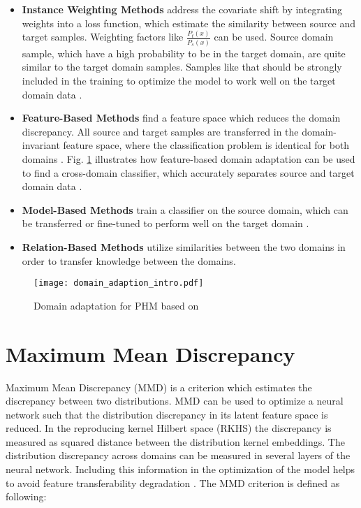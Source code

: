 \begin{itemize}
\item \textbf{Instance Weighting Methods} address the covariate shift by integrating weights into a loss function, which estimate the similarity between source and target samples. Weighting factors like $\frac{P_{t}(x)}{P_{s}(x)}$ can be used. Source domain sample, which have a high probability to be in the target domain, are quite similar to the target domain samples. Samples like that should be strongly included in the training to optimize the model to work well on the target domain data \cite{AZAMFAR2020103932}.
\item \textbf{Feature-Based Methods} find a feature space which reduces the domain discrepancy. All source and target samples are transferred in the domain-invariant feature space, where the classification problem is identical for both domains \cite{AZAMFAR2020103932}. Fig. \ref{fig:Domain_adaption_intro} illustrates how feature-based domain adaptation can be used to find a cross-domain classifier, which accurately separates source and target domain data \cite{AZAMFAR2020103932}. 
\item \textbf{Model-Based Methods} train a classifier on the source domain, which can be transferred or fine-tuned to perform well on the target domain \cite{AZAMFAR2020103932}.
\item \textbf{Relation-Based Methods} utilize similarities between the two domains in order to transfer knowledge between the domains\cite{AZAMFAR2020103932}. 
\end{itemize}

\begin{figure}[H]
  \centering
  \texttt{[image: domain\_adaption\_intro.pdf]}
  \caption {Domain adaptation for PHM based on \cite{Pandhare2021}} \label{fig:Domain_adaption_intro}
\end{figure}


\section{Maximum Mean Discrepancy}
Maximum Mean Discrepancy (MMD) is a criterion which estimates the discrepancy between two distributions. MMD can be used to optimize a neural network such that the distribution discrepancy in its latent feature space is reduced. In the reproducing kernel Hilbert space (RKHS) the discrepancy is measured as squared distance between the distribution kernel embeddings. The distribution discrepancy across domains can be measured in several layers of the neural network. Including this information in the optimization of the model helps to avoid feature transferability degradation \cite{li2020}. The MMD criterion is defined as following:

